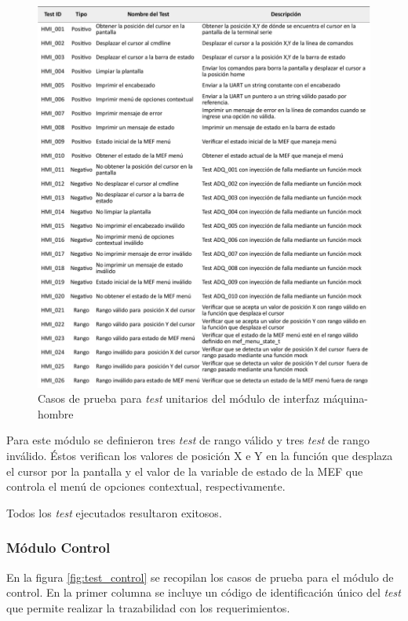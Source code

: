 \begin{figure}[htpb]
	\centering
	\includegraphics[width=\textwidth]{./Figures/TestHMI.pdf}
	\caption{Casos de prueba para \textit{test} unitarios del módulo de interfaz máquina-hombre}
	\label{fig:test_interfaz}
\end{figure}

Para este módulo se definieron tres \textit{test} de rango válido y tres \textit{test} de rango inválido. Éstos verifican los valores de posición X e Y en la función que desplaza el cursor por la pantalla y el valor de la variable de estado de la MEF que controla el menú de opciones contextual, respectivamente.

Todos los \textit{test} ejecutados resultaron exitosos.

\subsubsection{Módulo Control}

En la figura \ref{fig:test_control} se recopilan los casos de prueba para el módulo de control.  En la primer columna se incluye un código de identificación único del \textit{test} que permite realizar la trazabilidad con los requerimientos. %

